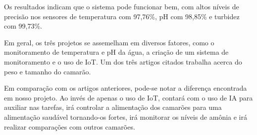 Os resultados indicam que o sistema pode funcionar bem, com altos níveis de precisão nos sensores de temperatura com 97,76\%, pH com 98,85\% e turbidez com 99,73\%.

Em geral, os três projetos se assemelham em diversos fatores, como o monitoramento de temperatura e pH da água, a criação de um sistema de monitoramento e o uso de IoT. Um dos três artigos citados trabalha acerca do peso e tamanho do camarão. 

Em comparação com os artigos anteriores, pode-se notar a diferença encontrada em nosso projeto. Ao invés de apenas o uso de IoT, contará com o uso de IA para auxiliar nas tarefas, irá controlar a alimentação dos camarões para uma alimentação saudável tornando-os fortes, irá monitorar os níveis de amônia e irá realizar comparações com outros camarões. 